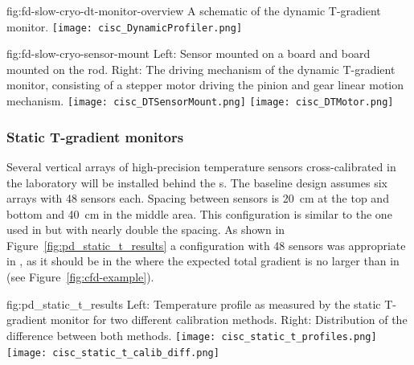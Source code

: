 \begin{dunefigure}{fig:fd-slow-cryo-dt-monitor-overview}
  {%
  A schematic of the dynamic T-gradient monitor.}
 \texttt{[image: cisc\_DynamicProfiler.png]}
\end{dunefigure}
\begin{dunefigure}{fig:fd-slow-cryo-sensor-mount}
  {Left: Sensor mounted on a  board and  board mounted on the rod. Right:
    The driving mechanism of the dynamic T-gradient monitor, consisting of a stepper motor driving the pinion and gear linear motion mechanism. }
  \texttt{[image: cisc\_DTSensorMount.png]}
  \hspace{3cm}%
  \texttt{[image: cisc\_DTMotor.png]}
\end{dunefigure}


\subsubsection{Static T-gradient monitors}
\label{sec:fdgen-slow-cryo-static-therm}

Several vertical arrays of high-precision temperature sensors cross-calibrated in the laboratory will be installed behind the s.  
The baseline design assumes six arrays with \num{48} sensors each. Spacing between sensors
is \SI{20}{cm} at the top and bottom and \SI{40}{cm} in the middle area. This configuration is similar to the one used in  but with nearly double the spacing. 
As shown in Figure~\ref{fig:pd_static_t_results} a configuration with \num{48} sensors was appropriate in , as it should be in the  where the expected total gradient is no larger than in  (see Figure~\ref{fig:cfd-example}). 

\begin{dunefigure}{fig:pd_static_t_results}{
 Left: Temperature profile as measured by the static T-gradient monitor for two different calibration methods. Right: Distribution of the difference between both methods.}
  \texttt{[image: cisc\_static\_t\_profiles.png]}%
  \texttt{[image: cisc\_static\_t\_calib\_diff.png]}%
\end{dunefigure}

